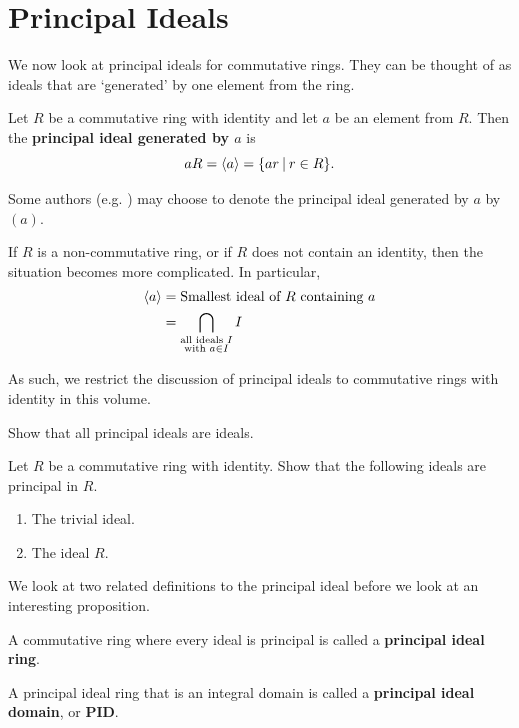 \section{Principal Ideals}
We now look at principal ideals for commutative rings. They can be thought of as ideals that are `generated' by one element from the ring.
\begin{definition}
    Let $R$ be a commutative ring with identity and let $a$ be an element from $R$. Then the \textbf{principal ideal generated by $a$} is
    \[
        aR = \princ{a} = \{ar \vert r \in R\}.
    \]
\end{definition}
\begin{remark}
    Some authors (e.g. \cite[p.~251]{dummit_foote_2004}) may choose to denote the principal ideal generated by $a$ by $(a)$.
\end{remark}
\begin{remark}
    If $R$ is a non-commutative ring, or if $R$ does not contain an identity, then the situation becomes more complicated. In particular,
    \begin{align*}
        \left\langle a\right\rangle &= \text{Smallest ideal of } R \text{ containing }a\\
        &= \bigcap_{\substack{\text{all ideals }I \\ \text{with } a \in I}}I
    \end{align*}
    
    As such, we restrict the discussion of principal ideals to commutative rings with identity in this volume.
\end{remark}
\begin{exercise}
    Show that all principal ideals are ideals.
\end{exercise}
\begin{exercise}\label{exercise-trivial-ideal-and-whole-ring-are-principal-ideals}
    Let $R$ be a commutative ring with identity. Show that the following ideals are principal in $R$.
    \begin{enumerate}[label=(\alph*)]
        \item The trivial ideal.
        \item The ideal $R$.
    \end{enumerate}
\end{exercise}

We look at two related definitions to the principal ideal before we look at an interesting proposition.
\begin{definition}
    A commutative ring where every ideal is principal is called a \textbf{principal ideal ring}.
\end{definition}
\begin{definition}
    A principal ideal ring that is an integral domain is called a \textbf{principal ideal domain}, or \textbf{PID}.
\end{definition}

